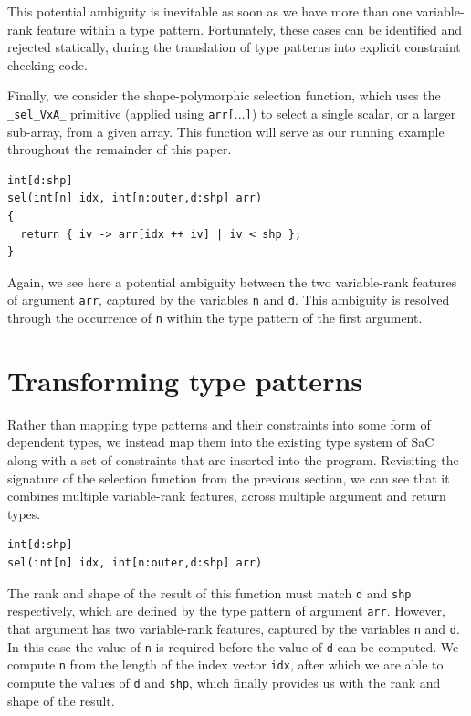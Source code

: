 \documentclass[sigconf,screen]{acmart}
\begin{document}
This potential ambiguity is inevitable as soon as we have more than one variable-rank feature within a type pattern.
Fortunately, these cases can be identified and rejected statically, during the translation of type patterns into explicit constraint checking code.

Finally, we consider the shape-polymorphic selection function, which uses the \verb|_sel_VxA_| primitive (applied using \texttt{arr[$...$]}) to select a single scalar, or a larger sub-array, from a given array.
This function will serve as our running example throughout the remainder of this paper.

\begin{lstlisting}
int[d:shp]
sel(int[n] idx, int[n:outer,d:shp] arr)
{
  return { iv -> arr[idx ++ iv] | iv < shp };
}
\end{lstlisting}

Again, we see here a potential ambiguity between the two variable-rank features of argument \texttt{arr}, captured by the variables \texttt{n} and \texttt{d}.
This ambiguity is resolved through the occurrence of \texttt{n} within the type pattern of the first argument.

\section{Transforming type patterns}
Rather than mapping type patterns and their constraints into some form of dependent types, we instead map them into the existing type system of SaC along with a set of constraints that are inserted into the program.
Revisiting the signature of the selection function from the previous section, we can see that it combines multiple variable-rank features, across multiple argument and return types.

\begin{lstlisting}
int[d:shp]
sel(int[n] idx, int[n:outer,d:shp] arr)
\end{lstlisting}

The rank and shape of the result of this function must match \texttt{d} and \texttt{shp} respectively, which are defined by the type pattern of argument \texttt{arr}.
However, that argument has two variable-rank features, captured by the variables \texttt{n} and \texttt{d}.
In this case the value of \texttt{n} is required before the value of \texttt{d} can be computed.
We compute \texttt{n} from the length of the index vector \texttt{idx}, after which we are able to compute the values of \texttt{d} and \texttt{shp}, which finally provides us with the rank and shape of the result.
\end{document}
